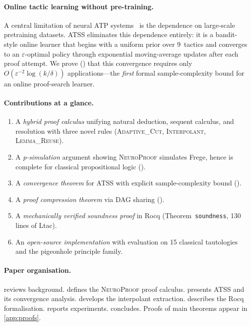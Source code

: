 \documentclass[conference]{IEEEtran}
\newcommand{\NP}{\textsc{NeuroProof}}
\newcommand{\ATSS}{\textsc{ATSS}}
\begin{document}
\paragraph{Online tactic learning without pre-training.}
A central limitation of neural ATP
systems~\cite{KusumoYahata2018,DeepSeekProver2024,SongYangAnandkumar2024,
AlphaProof2025,DeepSeekProverV2}
is the dependence on large-scale pretraining datasets.  \ATSS{}
eliminates this dependence entirely: it is a bandit-style online
learner that begins with a uniform prior over 9~tactics and
converges to an $\varepsilon$-optimal policy through exponential
moving-average updates after each proof attempt.  We prove
() that this convergence requires only
$O(\varepsilon^{-2}\log(k/\delta))$ applications---the \emph{first}
formal sample-complexity bound for an online proof-search learner.

\paragraph{Contributions at a glance.}
\begin{enumerate}
  \item A \emph{hybrid proof calculus} unifying natural deduction,
    sequent calculus, and resolution with three novel rules
    (\textsc{Adaptive\_Cut}, \textsc{Interpolant},
    \textsc{Lemma\_Reuse}).
  \item A \emph{p-simulation} argument showing \NP{} simulates Frege,
    hence is complete for classical propositional logic
    ().
  \item A \emph{convergence theorem} for ATSS with explicit
    sample-complexity bound ().
  \item A \emph{proof compression theorem} via DAG sharing
    ().
  \item A \emph{mechanically verified soundness proof} in Rocq
    (Theorem~\texttt{soundness}, 130 lines of Ltac).
  \item An \emph{open-source implementation} with evaluation on 15
    classical tautologies and the pigeonhole principle family.
\end{enumerate}

\paragraph{Paper organisation.}
 reviews background.
 defines the \NP{} proof calculus.
 presents \ATSS{} and its convergence analysis.
 develops the interpolant extraction.
 describes the Rocq formalisation.
 reports experiments.
 concludes.  Proofs of main theorems appear in
\cref{app:proofs}.
\end{document}
